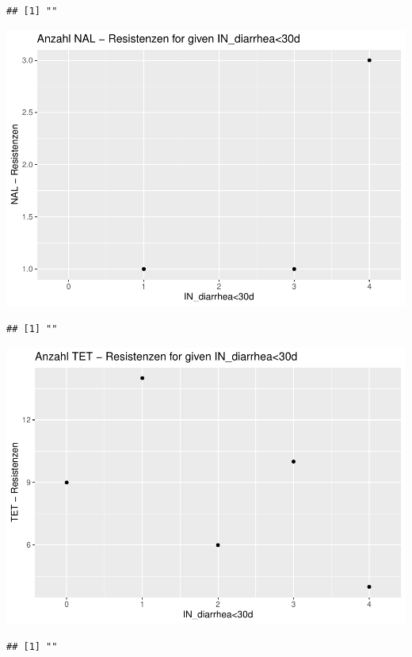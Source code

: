 \documentclass[
]{article}
\begin{document}
\begin{verbatim}
## [1] ""
\end{verbatim}

\includegraphics{NResistenzen_files/figure-latex/numerical_variables-37.pdf}

\begin{verbatim}
## [1] ""
\end{verbatim}

\includegraphics{NResistenzen_files/figure-latex/numerical_variables-38.pdf}

\begin{verbatim}
## [1] ""
\end{verbatim}
\end{document}
